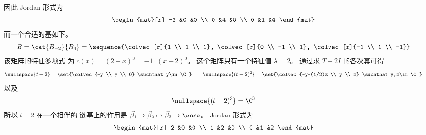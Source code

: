             因此 Jordan 形式为  
            \begin{equation*}
              \begin{mat}[r]
                -2  &0  &0  \\
                 0  &4  &0  \\
                 0  &1  &4
              \end{mat}
            \end{equation*}
            而一个合适的基如下。
            \begin{equation*}
              B=\cat{B_{-2}}{B_4}=
                \sequence{\colvec[r]{1 \\ 1 \\ 1},
                          \colvec[r]{0 \\ -1 \\ 1},
                          \colvec[r]{-1 \\ 1 \\ -1}}
            \end{equation*}
        \partsitem 该矩阵的特征多项式
            为 \( c(x)=(2-x)^3=-1\cdot (x-2)^3 \)。
            这个矩阵只有一个特征值 $\lambda=2$。
            通过求 $T-2I$ 的各次幂可得
            \begin{equation*}
              \nullspace{t-2}=\set{\colvec{-y \\ y \\ 0}
                                      \suchthat y\in\C} 
              \qquad
              \nullspace{(t-2)^2}=\set{\colvec{-y-(1/2)z \\ y \\ z}
                                          \suchthat y,z\in\C}
            \end{equation*}
            以及
            \begin{equation*} 
              \nullspace{(t-2)^3}=\C^3
            \end{equation*}
            所以
            $t-2$ 在一个相伴的
            链基上的作用是
            $\vec{\beta}_1\mapsto\vec{\beta}_2\mapsto
                   \vec{\beta}_3\mapsto\zero$。
            Jordan 形式为
            \begin{equation*}
                  \begin{mat}[r]
                    2  &0  &0  \\
                    1  &2  &0  \\
                    0  &1  &2
                  \end{mat}
            \end{equation*}
